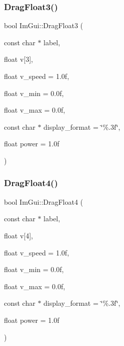 \hypertarget{namespace_im_gui_a3a365703646c6fb5357f21a13c531bfe}{}\label{namespace_im_gui_a3a365703646c6fb5357f21a13c531bfe} 
\subsubsection{\texorpdfstring{Drag\+Float3()}{DragFloat3()}}
{\footnotesize\ttfamily bool Im\+Gui\+::\+Drag\+Float3 (\begin{DoxyParamCaption}\item[{const char $\ast$}]{label,  }\item[{float}]{v\mbox{[}3\mbox{]},  }\item[{float}]{v\+\_\+speed = {\ttfamily 1.0f},  }\item[{float}]{v\+\_\+min = {\ttfamily 0.0f},  }\item[{float}]{v\+\_\+max = {\ttfamily 0.0f},  }\item[{const char $\ast$}]{display\+\_\+format = {\ttfamily \char`\"{}\%.3f\char`\"{}},  }\item[{float}]{power = {\ttfamily 1.0f} }\end{DoxyParamCaption})}

\hypertarget{namespace_im_gui_a6dfd9e5d7adc6106e9391fc971d2f8bc}{}\label{namespace_im_gui_a6dfd9e5d7adc6106e9391fc971d2f8bc} 
\subsubsection{\texorpdfstring{Drag\+Float4()}{DragFloat4()}}
{\footnotesize\ttfamily bool Im\+Gui\+::\+Drag\+Float4 (\begin{DoxyParamCaption}\item[{const char $\ast$}]{label,  }\item[{float}]{v\mbox{[}4\mbox{]},  }\item[{float}]{v\+\_\+speed = {\ttfamily 1.0f},  }\item[{float}]{v\+\_\+min = {\ttfamily 0.0f},  }\item[{float}]{v\+\_\+max = {\ttfamily 0.0f},  }\item[{const char $\ast$}]{display\+\_\+format = {\ttfamily \char`\"{}\%.3f\char`\"{}},  }\item[{float}]{power = {\ttfamily 1.0f} }\end{DoxyParamCaption})}

